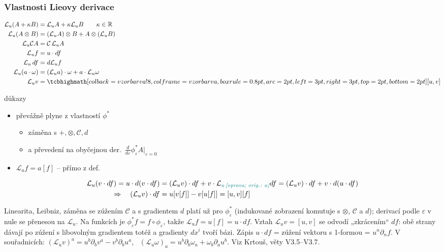 \subsubsection*{Vlastnosti Lieovy derivace}
\begin{veta}
\begin{align*}
  \mathcal{L}_u(A + \kappa B) &= \mathcal{L}_uA + \kappa\mathcal{L}_uB \qquad \kappa\in\mathbb{R} \\
  \mathcal{L}_u(A\otimes B) &= (\mathcal{L}_uA)\otimes B + A\otimes(\mathcal{L}_uB) \\
  \mathcal{L}_u\mathcal{C}A &= \mathcal{C}\,\mathcal{L}_uA \\
  \mathcal{L}_uf &= u\cdot df \\
  \mathcal{L}_u\,df &= d\mathcal{L}_uf \\
  \mathcal{L}_u(a\cdot\omega) &= (\mathcal{L}_ua)\cdot\omega + a\cdot\mathcal{L}_u\omega \\
  \mathcal{L}_uv &= \vzorec{[u,v]}
\end{align*}
\end{veta}

důkazy
\begin{itemize}[nosep]
  \item[] převážně plyne z vlastností $\phi^*$
  \begin{itemize}[nosep]
    \item[--] záměna s $+,\otimes,\mathcal{C},d$
    \item[] a převedení na obyčejnou der.\ $\frac{d}{d\varepsilon}\phi_\varepsilon^*A\big|_{\varepsilon=0}$
  \end{itemize}
  \item[] $\mathcal{L}_af = a[f]$ \quad -- přímo z def.
\end{itemize}
\begin{align*}
  \mathcal{L}_u(v\cdot df) = u\cdot d(v\cdot df) &= (\mathcal{L}_uv)\cdot df + v\cdot\mathcal{L}_{\oprava{u}{a}} df
    = (\mathcal{L}_uv)\cdot df + v\cdot d(u\cdot df) \\
  \Rightarrow\quad (\mathcal{L}_uv)\cdot df &= u[v[f]] - v[u[f]] = [u,v][f]
\end{align*}

\begin{vysvetleni}
Linearita, Leibniz, záměna se zúžením $\mathcal{C}$ a s gradientem $d$ platí už pro $\phi_\varepsilon^*$ (indukované zobrazení komutuje s $\otimes$, $\mathcal{C}$ a $d$); derivací podle $\varepsilon$ v nule se přenesou na $\mathcal{L}_u$. Na funkcích je $\phi_\varepsilon^*f=f\circ\phi_\varepsilon$, takže $\mathcal{L}_uf=u[f]=u\cdot df$.
Vztah $\mathcal{L}_uv=[u,v]$ se odvodí „zkrácením“ $df$: obě strany dávají po zúžení s libovolným gradientem totéž a gradienty $dx^i$ tvoří bázi. Zápis $u\cdot df$ = zúžení vektoru s 1-formou = $u^n\partial_nf$.
V souřadnicích: $(\mathcal{L}_uv)^a=u^b\partial_bv^a-v^b\partial_bu^a$, \ $(\mathcal{L}_u\omega)_a=u^b\partial_b\omega_a+\omega_b\partial_au^b$.
Viz Krtouš, věty V3.5--V3.7.
\end{vysvetleni}

